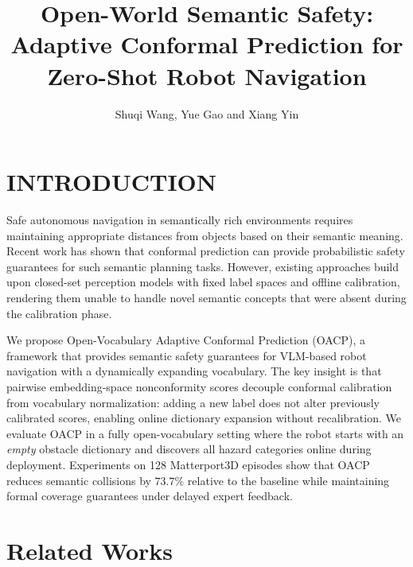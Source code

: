 \documentclass[letterpaper, 10 pt, conference]{ieeeconf}  %
\title{\LARGE \bf
Open-World Semantic Safety: Adaptive Conformal Prediction for Zero-Shot Robot Navigation
}
\author{Shuqi Wang, Yue Gao and Xiang Yin}
\begin{document}
\maketitle
\thispagestyle{empty}
\pagestyle{empty}


\begin{abstract}

\end{abstract}


\section{INTRODUCTION}

Safe autonomous navigation in semantically rich environments requires maintaining appropriate distances from objects based on their semantic meaning. Recent work has shown that conformal prediction can provide probabilistic safety guarantees for such semantic planning tasks. However, existing approaches build upon closed-set perception models with fixed label spaces and offline calibration, rendering them unable to handle novel semantic concepts that were absent during the calibration phase.

We propose Open-Vocabulary Adaptive Conformal Prediction (OACP), a framework that provides semantic safety guarantees for VLM-based robot navigation with a dynamically expanding vocabulary. The key insight is that pairwise embedding-space nonconformity scores decouple conformal calibration from vocabulary normalization: adding a new label does not alter previously calibrated scores, enabling online dictionary expansion without recalibration. We evaluate OACP in a fully open-vocabulary setting where the robot starts with an \textit{empty} obstacle dictionary and discovers all hazard categories online during deployment. Experiments on 128 Matterport3D episodes show that OACP reduces semantic collisions by $73.7\%$ relative to the baseline while maintaining formal coverage guarantees under delayed expert feedback.



\section{Related Works}
\end{document}
